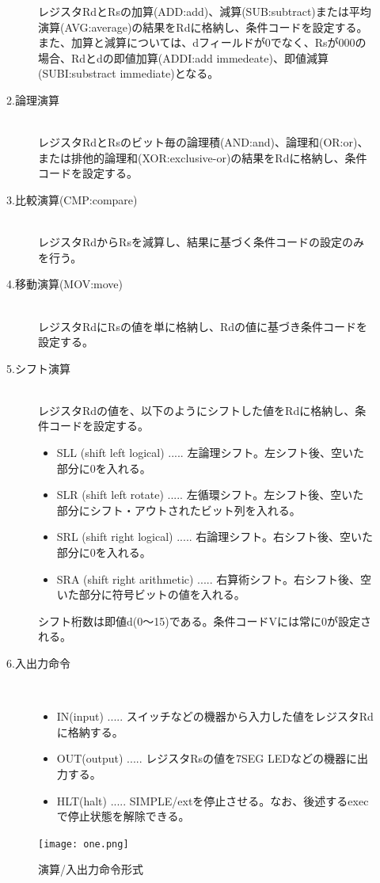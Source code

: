 \documentclass{jarticle}
\begin{document}
\begin{description}
\begin{description}
レジスタRdとRsの加算(ADD:add)、減算(SUB:subtract)または平均演算(AVG:average)の結果をRdに格納し、条件コードを設定する。また、加算と減算については、dフィールドが0でなく、Rsが000の場合、Rdとdの即値加算(ADDI:add immedeate)、即値減算(SUBI:substract immediate)となる。
\item[2.論理演算] \leavevmode \\
レジスタRdとRsのビット毎の論理積(AND:and)、論理和(OR:or)、または排他的論理和(XOR:exclusive-or)の結果をRdに格納し、条件コードを設定する。
\item[3.比較演算(CMP:compare)] \leavevmode \\
レジスタRdからRsを減算し、結果に基づく条件コードの設定のみを行う。
\item[4.移動演算(MOV:move)] \leavevmode \\
レジスタRdにRsの値を単に格納し、Rdの値に基づき条件コードを設定する。
\item[5.シフト演算] \leavevmode \\
レジスタRdの値を、以下のようにシフトした値をRdに格納し、条件コードを設定する。
\begin{itemize}
\item SLL (shift left logical) ..... 左論理シフト。左シフト後、空いた部分に0を入れる。
\item SLR (shift left rotate) ..... 左循環シフト。左シフト後、空いた部分にシフト・アウトされたビット列を入れる。
\item SRL (shift right logical) ..... 右論理シフト。右シフト後、空いた部分に0を入れる。
\item SRA (shift right arithmetic) ..... 右算術シフト。右シフト後、空いた部分に符号ビットの値を入れる。
\end{itemize}
シフト桁数は即値d(0〜15)である。条件コードVには常に0が設定される。
\item[6.入出力命令] \leavevmode \\
\begin{itemize}
\item IN(input) ..... スイッチなどの機器から入力した値をレジスタRdに格納する。
\item OUT(output) ..... レジスタRsの値を7SEG LEDなどの機器に出力する。
\item HLT(halt) ..... SIMPLE/extを停止させる。なお、後述するexecで停止状態を解除できる。
\end{itemize}
\end{description}
\begin{figure}[H]
  \centering
  \caption{演算/入出力命令形式}
  \texttt{[image: one.png]}
\end{figure}

\end{description}
\end{document}
